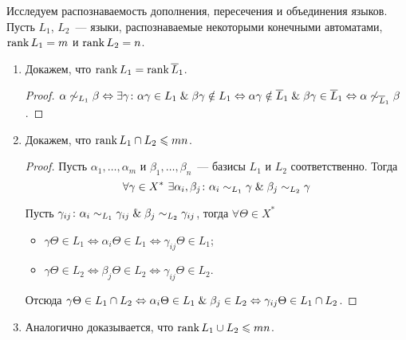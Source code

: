 Исследуем распознаваемость дополнения, пересечения и объединения языков.
Пусть $L_1$, $L_2$~--- языки, распознаваемые некоторыми конечными автоматами, $\operatorname{rank} L_1 = m$ и $\operatorname{rank} L_2 = n$.
\begin{enumerate}
	\item Докажем, что $\operatorname{rank} L_1 = \operatorname{rank} \overline L_1$.
	\begin{proof}
	$\alpha \not\sim_{L_1} \beta \Leftrightarrow
	\exists \gamma \colon \alpha \gamma \in L_1 \mathrel{\&} \beta \gamma \notin L_1 \Leftrightarrow
	\alpha \gamma \notin \overline L_1 \mathrel{\&} \beta \gamma \in \overline L_1 \Leftrightarrow
	\alpha \not\sim_{\overline L_1} \beta$.
	\end{proof}
	
	\item Докажем, что $\operatorname{rank} L_1 \cap L_2 \leqslant mn$.
	\begin{proof}
	Пусть $\alpha_1, \ldots, \alpha_m$ и $\beta_1, \ldots, \beta_n$~--- базисы $L_1$ и $L_2$ соответственно.
	Тогда
	\begin{equation*}
	\forall \gamma \in X^* \ \exists \alpha_i, \beta_j \colon \alpha_i \sim_{L_1} \gamma \mathrel{\&} \beta_j \sim_{L_2} \gamma
	\end{equation*}
	
	Пусть $\gamma_{ij} \colon \alpha_i \sim_{L_1} \gamma_{ij} \mathrel{\&} \beta_j \sim_{L_2} \gamma_{ij}$, тогда $\forall \Theta \in X^*$
	\begin{itemize}
		\item $\gamma \Theta \in L_1 \Leftrightarrow
		\alpha_i \Theta \in L_1 \Leftrightarrow
		\gamma_{ij} \Theta \in L_1$;
		\item $\gamma \Theta \in L_2 \Leftrightarrow
		\beta_j \Theta \in L_2 \Leftrightarrow
		\gamma_{ij} \Theta \in L_2$.
	\end{itemize}
	
	Отсюда $\gamma \Theta \in L_1 \cap L_2 \Leftrightarrow
	\alpha_i \Theta \in L_1 \mathrel{\&} \beta_j \in L_2 \Leftrightarrow
	\gamma_{ij} \Theta \in L_1 \cap L_2$.
	\end{proof}
	
	\item Аналогично доказывается, что $\operatorname{rank} L_1 \cup L_2 \leqslant mn$.
\end{enumerate}

